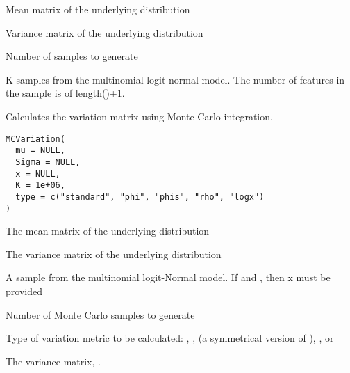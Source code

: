\documentclass[a4paper]{book}
\begin{document}
%
\begin{Arguments}
\begin{ldescription}
\item[\code{mu}] Mean matrix of the underlying distribution

\item[\code{Sigma}] Variance matrix of the underlying distribution

\item[\code{K}] Number of samples to generate
\end{ldescription}
\end{Arguments}
%
\begin{Value}
K samples from the multinomial logit-normal model. The number of features
in the sample is of length()+1.
\end{Value}
%
\begin{Description}\relax
Calculates the variation matrix using Monte Carlo integration.
\end{Description}
%
\begin{Usage}
\begin{verbatim}
MCVariation(
  mu = NULL,
  Sigma = NULL,
  x = NULL,
  K = 1e+06,
  type = c("standard", "phi", "phis", "rho", "logx")
)
\end{verbatim}
\end{Usage}
%
\begin{Arguments}
\begin{ldescription}
\item[\code{mu}] The mean matrix of the underlying distribution

\item[\code{Sigma}] The variance matrix of the underlying distribution

\item[\code{x}] A sample from the multinomial logit-Normal model. If  
and , then x must be provided

\item[\code{K}] Number of Monte Carlo samples to generate

\item[\code{type}] Type of variation metric to be calculated: , ,
 (a symmetrical version of ), , or 
\end{ldescription}
\end{Arguments}
%
\begin{Value}
The variance matrix, .
\end{Value}
\end{document}
